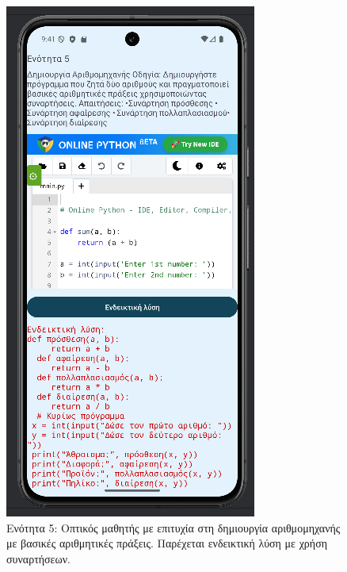 \documentclass[11pt]{report}
\begin{document}
\begin{figure}[H]
  \centering
  \includegraphics[width=\linewidth, height=0.35\textheight, keepaspectratio]{Figures/εικόνα (12).png}
  \caption{Ενότητα 5: Οπτικός μαθητής με επιτυχία στη δημιουργία αριθμομηχανής με βασικές αριθμητικές πράξεις. Παρέχεται ενδεικτική λύση με χρήση συναρτήσεων.}
\end{figure}
\end{document}
